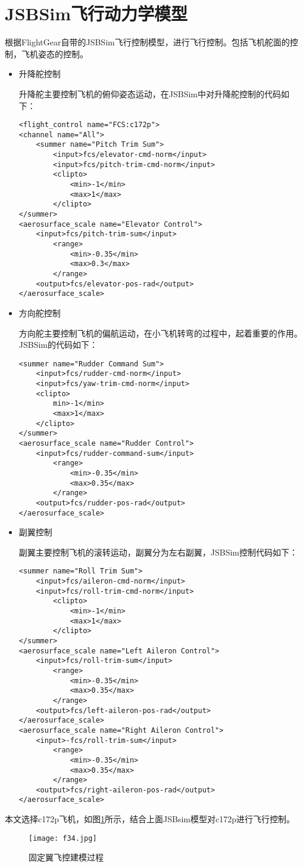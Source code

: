 \section{JSBSim飞行动力学模型}
根据FlightGear自带的JSBSim飞行控制模型，进行飞行控制。包括飞机舵面的控制，飞机姿态的控制。
\begin{itemize}
  \item 升降舵控制

  升降舵主要控制飞机的俯仰姿态运动，在JSBSim中对升降舵控制的代码如下：
   \begin{lstlisting}[language==XML]
<flight_control name="FCS:c172p">
<channel name="All">
    <summer name="Pitch Trim Sum">
        <input>fcs/elevator-cmd-norm</input>
        <input>fcs/pitch-trim-cmd-norm</input>
        <clipto>
            <min>-1</min>
            <max>1</max>
        </clipto>
</summer>
<aerosurface_scale name="Elevator Control">
    <input>fcs/pitch-trim-sum</input>
        <range>
            <min>-0.35</min>
            <max>0.3</max>
        </range>
    <output>fcs/elevator-pos-rad</output>
</aerosurface_scale>
 \end{lstlisting}
  \item 方向舵控制

  方向舵主要控制飞机的偏航运动，在小飞机转弯的过程中，起着重要的作用。JSBSim的代码如下：
  \begin{lstlisting}[language==XML]
<summer name="Rudder Command Sum">
    <input>fcs/rudder-cmd-norm</input> 
    <input>fcs/yaw-trim-cmd-norm</input>
    <clipto>
        min>-1</min>
        <max>1</max>
    </clipto>
</summer>
<aerosurface_scale name="Rudder Control">
    <input>fcs/rudder-command-sum</input>
        <range>
            <min>-0.35</min>
            <max>0.35</max>
        </range>
    <output>fcs/rudder-pos-rad</output>
</aerosurface_scale>
 \end{lstlisting}
  \item 副翼控制
  
  副翼主要控制飞机的滚转运动，副翼分为左右副翼，JSBSim控制代码如下：
    \begin{lstlisting}[language==XML]
<summer name="Roll Trim Sum">
    <input>fcs/aileron-cmd-norm</input>
    <input>fcs/roll-trim-cmd-norm</input>
        <clipto>
            <min>-1</min>
            <max>1</max>
        </clipto>
</summer>
<aerosurface_scale name="Left Aileron Control">
    <input>fcs/roll-trim-sum</input>
        <range>
            <min>-0.35</min>
            <max>0.35</max>
        </range>
    <output>fcs/left-aileron-pos-rad</output>
</aerosurface_scale>
<aerosurface_scale name="Right Aileron Control">
    <input>-fcs/roll-trim-sum</input>
        <range>
            <min>-0.35</min>
            <max>0.35</max>
        </range>
    <output>fcs/right-aileron-pos-rad</output>
</aerosurface_scale>
 \end{lstlisting}
\end{itemize}

本文选择c172p飞机，如图\ref{fig41}所示，结合上面JSBsim模型对c172p进行飞行控制。

\begin{figure}[!ht]
\centering
\texttt{[image: f34.jpg]}
\caption{固定翼飞控建模过程}
\label{fig41}
\end{figure}


